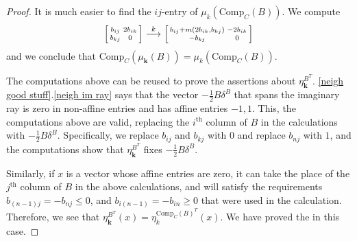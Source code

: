 \documentclass{amsart}
\theoremstyle{definition}
\theoremstyle{remark}
\numberwithin{equation}{section}
\newcommand{\set}[1]{{\left\lbrace #1 \right\rbrace}}
\renewcommand{\th}{^\text{th}}
\newcommand{\0}{{\mathbf{0}}}
\newcommand{\Comp}{\mathrm{Comp}_C}
\newcommand{\kk}{\mathbf{k}}
\renewcommand{\th}{^\text{th}}
\begin{document}
\begin{proof}
It is much easier to find the $ij$-entry of $\mu_k(\Comp(B))$.
We compute
\[
\begin{bsmallmatrix*}
b_{ij}&2b_{ik}\\
b_{kj}&0
\end{bsmallmatrix*}
\overset{k}{\longrightarrow}
\begin{bsmallmatrix*}
b_{ij}+m(2b_{ik},b_{kj})&-2b_{ik}\\
-b_{kj}&0
\end{bsmallmatrix*}
\]
and we conclude that $\Comp(\mu_\kk(B))=\mu_k(\Comp(B))$.

The computations above can be reused to prove the assertions about $\eta^{B^T}_\kk$.
\cref{neigh good stuff}.\ref{neigh im ray} says that the vector $-\frac12B\delta^B$ that spans the imaginary ray is zero in non-affine entries and has affine entries $-1,1$.
This, the computations above are valid, replacing the $i\th$ column of $B$ in the calculations with $-\frac12B\delta^B$.
Specifically, we replace $b_{ij}$ and $b_{kj}$ with $0$ and replace $b_{nj}$ with $1$, and the computations show that $\eta^{B^T}_\kk$ fixes $-\frac12B\delta^B$.

Similarly, if $x$ is a vector whose affine entries are zero, it can take the place of the $j\th$ column of $B$ in the above calculations, and will satisfy the requirements $b_{(n-1)j}=-b_{nj}\le0$, and $b_{i(n-1)}=-b_{in}\ge0$ that were used in the calculation.  
Therefore, we see that $\eta^{B^T}_\kk(x)=\eta^{\Comp(B)^T}_k(x)$.
We have proved the  in this case.


\end{proof}
\end{document}
